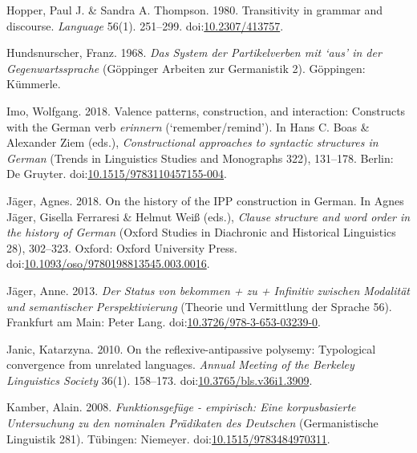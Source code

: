 \leavevmode{}%
Hopper, Paul J. \& Sandra A. Thompson. 1980. Transitivity in grammar and
discourse. \emph{Language} 56(1). 251--299.
doi:\href{https://doi.org/10.2307/413757}{10.2307/413757}.

\leavevmode{}%
Hundsnurscher, Franz. 1968. \emph{Das {System} der {Partikelverben} mit
{`aus'} in der {Gegenwartssprache}} (Göppinger Arbeiten {zur}
Germanistik 2). Göppingen: Kümmerle.

\leavevmode{}%
Imo, Wolfgang. 2018. Valence patterns, construction, and interaction:
Constructs with the {German} verb \emph{erinnern} ({`remember/remind'}).
In Hans C. Boas \& Alexander Ziem (eds.), \emph{Constructional
approaches to syntactic structures in {German}} (Trends in Linguistics
Studies and Monographs 322), 131--178. Berlin: De Gruyter.
doi:\href{https://doi.org/10.1515/9783110457155-004}{10.1515/9783110457155-004}.

\leavevmode{}%
Jäger, Agnes. 2018. On the history of the {IPP} construction in
{German}. In Agnes Jäger, Gisella Ferraresi \& Helmut Weiß (eds.),
\emph{Clause structure and word order in the history of {German}}
(Oxford Studies in Diachronic and Historical Linguistics 28), 302--323.
Oxford: Oxford University Press.
doi:\href{https://doi.org/10.1093/oso/9780198813545.003.0016}{10.1093/oso/9780198813545.003.0016}.

\leavevmode{}%
Jäger, Anne. 2013. \emph{Der {Status} von \emph{bekommen + zu +}
{Infinitiv} zwischen {Modalität} und semantischer {Perspektivierung}}
(Theorie {und} Vermittlung {der} Sprache 56). Frankfurt am Main: Peter
Lang.
doi:\href{https://doi.org/10.3726/978-3-653-03239-0}{10.3726/978-3-653-03239-0}.

\leavevmode{}%
Janic, Katarzyna. 2010. On the reflexive-antipassive polysemy:
Typological convergence from unrelated languages. \emph{Annual Meeting
of the Berkeley Linguistics Society} 36(1). 158--173.
doi:\href{https://doi.org/10.3765/bls.v36i1.3909}{10.3765/bls.v36i1.3909}.

\leavevmode{}%
Kamber, Alain. 2008. \emph{Funktionsgefüge - empirisch: Eine
korpusbasierte {Untersuchung} zu den nominalen {Prädikaten} des
{Deutschen}} (Germanistische Linguistik 281). Tübingen: Niemeyer.
doi:\href{https://doi.org/10.1515/9783484970311}{10.1515/9783484970311}.


